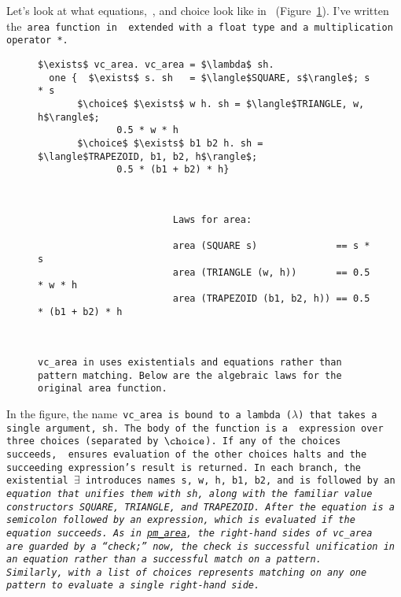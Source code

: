 \documentclass[manuscript,screen 12pt, nonacm]{acmart}
\begin{document}
    Let's look at what equations,~\one, and choice look like in~\VC
    (Figure~\ref{fig:versearea}). I've written the~\tt{area} function in~\VC
    extended with a~\tt{float} type and a multiplication operator~\tt{*}.

    \begin{figure}[]
        \verselst
        \begin{lstlisting}[numbers=none]
$\exists$ vc_area. vc_area = $\lambda$ sh. 
  one {  $\exists$ s. sh   = $\langle$SQUARE, s$\rangle$; s * s
       $\choice$ $\exists$ w h. sh = $\langle$TRIANGLE, w, h$\rangle$; 
              0.5 * w * h
       $\choice$ $\exists$ b1 b2 h. sh = $\langle$TRAPEZOID, b1, b2, h$\rangle$; 
              0.5 * (b1 + b2) * h}
        \end{lstlisting}

        \small
\begin{verbatim}


                        Laws for area: 
                        
                        area (SQUARE s)              == s * s 
                        area (TRIANGLE (w, h))       == 0.5 * w * h
                        area (TRAPEZOID (b1, b2, h)) == 0.5 * (b1 + b2) * h
        \end{verbatim}
    \caption{\tt{vc\_area} in~\VC uses existentials and equations rather than
    pattern matching. Below are the algebraic laws for the original~\tt{area}
    function.}~
    \label{fig:versearea}
    \end{figure}

    In the figure, the name~\tt{vc\_area} is bound to a lambda ($\lambda$) that
    takes a single argument,~\tt{sh}. The body of the function is a~\one
    expression over three choices (separated by~$\choice$). If any of the
    choices succeeds,~\one~ensures evaluation of the other choices halts and the
    succeeding expression's result is returned. In each branch, the existential
    $\exists$ introduces names~\tt{s, w, h, b1, b2}, and is followed by an
    \it{equation} that unifies them with~\tt{sh}, along with the familiar value
    constructors~\tt{SQUARE},~\tt{TRIANGLE}, and~\tt{TRAPEZOID}. After the
    equation is a semicolon followed by an expression, which is evaluated if the
    equation succeeds. As in~\hyperref[fig:pmarea]{\tt{pm\_area}}, the
    right-hand sides of~\tt{vc\_area} are~\it{guarded} by a “check;” now, the
    check is successful unification in an equation rather than a successful
    match on a pattern. Similarly,~\one with a list of choices represents
    matching on any~\it{one} pattern to evaluate a single right-hand side. 
\end{document}
